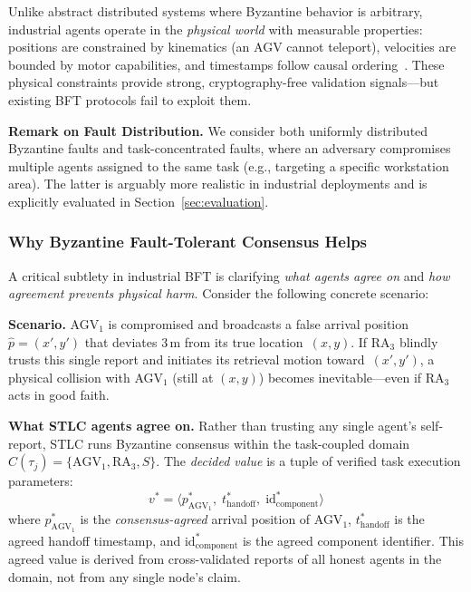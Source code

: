 \documentclass[manuscript,screen,review]{acmart}
\begin{document}
Unlike abstract distributed systems where Byzantine behavior is arbitrary, industrial agents operate in the \textit{physical world} with measurable properties: positions are constrained by kinematics (an AGV cannot teleport), velocities are bounded by motor capabilities, and timestamps follow causal ordering~\cite{li2022byzantine}. These physical constraints provide strong, cryptography-free validation signals---but existing BFT protocols fail to exploit them.

\textbf{Remark on Fault Distribution.} We consider both uniformly distributed Byzantine faults and task-concentrated faults, where an adversary compromises multiple agents assigned to the same task (e.g., targeting a specific workstation area). The latter is arguably more realistic in industrial deployments and is explicitly evaluated in Section~\ref{sec:evaluation}.

\subsubsection{Why Byzantine Fault-Tolerant Consensus Helps}

A critical subtlety in industrial BFT is clarifying \textit{what agents agree on} and \textit{how agreement prevents physical harm}. Consider the following concrete scenario:

\textbf{Scenario.} AGV$_1$ is compromised and broadcasts a false arrival position $\hat{p} = (x', y')$ that deviates 3\,m from its true location~$(x, y)$. If RA$_3$ blindly trusts this single report and initiates its retrieval motion toward~$(x', y')$, a physical collision with AGV$_1$ (still at $(x, y)$) becomes inevitable---even if RA$_3$ acts in good faith.

\textbf{What STLC agents agree on.} Rather than trusting any single agent's self-report, STLC runs Byzantine consensus within the task-coupled domain $C(\tau_j) = \{\text{AGV}_1, \text{RA}_3, S\}$. The \textit{decided value} is a tuple of verified task execution parameters:
\[
    v^* = \langle p^*_{\text{AGV}_1},\; t^*_{\text{handoff}},\; \text{id}^*_{\text{component}} \rangle
\]
where $p^*_{\text{AGV}_1}$ is the \emph{consensus-agreed} arrival position of AGV$_1$, $t^*_{\text{handoff}}$ is the agreed handoff timestamp, and $\text{id}^*_{\text{component}}$ is the agreed component identifier. This agreed value is derived from cross-validated reports of all honest agents in the domain, not from any single node's claim.
\end{document}
